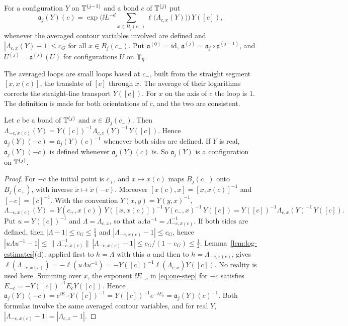 \begin{definition}\label{def:one-step}
For a configuration $Y$ on $\mathbb T^{(j-1)}$ and a bond $c$ of $\mathbb T^{(j)}$ put
\begin{equation}\label{eq:one-step}
\mathfrak a_j(Y)(c)=\exp\Big(\ii L^{-d}\sum_{x\in B_j(c_-)}\ell\big(\Lambda_{c,x}(Y)\big)\Big)\,Y([c]),
\end{equation}
whenever the averaged contour variables involved are defined and $|\Lambda_{c,x}(Y)-1|\le c_G$ for all $x\in B_j(c_-)$. Put $\mathfrak a^{(0)}=\mathrm{id}$, $\mathfrak a^{(j)}=\mathfrak a_j\circ\mathfrak a^{(j-1)}$, and $U^{(j)}=\mathfrak a^{(j)}(U)$ for configurations $U$ on $\mathbb T_\eta$.
\end{definition}

The averaged loops are small loops based at $c_-$, built from the straight segment $[x,x(c)]$, the translate of $[c]$ through $x$. The average of their logarithms corrects the straight-line transport $Y([c])$. For $x$ on the axis of $c$ the loop is $1$. The definition is made for both orientations of $c$, and the two are consistent.

\begin{lemma}[Reversal]\label{lem:reversal}
Let $c$ be a bond of $\mathbb T^{(j)}$ and $x\in B_j(c_-)$. Then $\Lambda_{-c,x(c)}(Y)=Y([c])^{-1}\Lambda_{c,x}(Y)^{-1}\,Y([c])$. Hence $\mathfrak a_j(Y)(-c)=\mathfrak a_j(Y)(c)^{-1}$ whenever both sides are defined. If $Y$ is real, $\mathfrak a_j(Y)(-c)$ is defined whenever $\mathfrak a_j(Y)(c)$ is. So $\mathfrak a_j(Y)$ is a configuration on $\mathbb T^{(j)}$.
\end{lemma}

\begin{proof}
For $-c$ the initial point is $c_+$, and $x\mapsto x(c)$ maps $B_j(c_-)$ onto $B_j(c_+)$, with inverse $\tilde x\mapsto\tilde x(-c)$. Moreover $[x(c),x]=[x,x(c)]^{-1}$ and $[-c]=[c]^{-1}$. With the convention $Y(x,y)=Y(y,x)^{-1}$,
\[
\Lambda_{-c,x(c)}(Y)=Y(c_+,x(c))\,Y([x,x(c)])^{-1}\,Y(c_-,x)^{-1}\,Y([c])=Y([c])^{-1}\Lambda_{c,x}(Y)^{-1}\,Y([c]).
\]
Put $u=Y([c])^{-1}$ and $\Lambda=\Lambda_{c,x}$, so that $u\Lambda u^{-1}=\Lambda_{-c,x(c)}^{-1}$. If both sides are defined, then $|\Lambda-1|\le c_G\le\frac14$ and $|\Lambda_{-c,x(c)}-1|\le c_G$, hence $|u\Lambda u^{-1}-1|\le\|\Lambda_{-c,x(c)}^{-1}\|\,|\Lambda_{-c,x(c)}-1|\le c_G/(1-c_G)\le\frac12$. Lemma~\ref{lem:log-estimates}(d), applied first to $h=\Lambda$ with this $u$ and then to $h=\Lambda_{-c,x(c)}$, gives $\ell(\Lambda_{-c,x(c)})=-\ell(u\Lambda u^{-1})=-Y([c])^{-1}\ell(\Lambda_{c,x})Y([c])$. No reality is used here. Summing over $x$, the exponent $\ii E_{-c}$ in \eqref{eq:one-step} for $-c$ satisfies $E_{-c}=-Y([c])^{-1}E_cY([c])$. Hence $\mathfrak a_j(Y)(-c)=e^{\ii E_{-c}}Y([c])^{-1}=Y([c])^{-1}e^{-\ii E_c}=\mathfrak a_j(Y)(c)^{-1}$. Both formulas involve the same averaged contour variables, and for real $Y$, $|\Lambda_{-c,x(c)}-1|=|\Lambda_{c,x}-1|$.
\end{proof}

